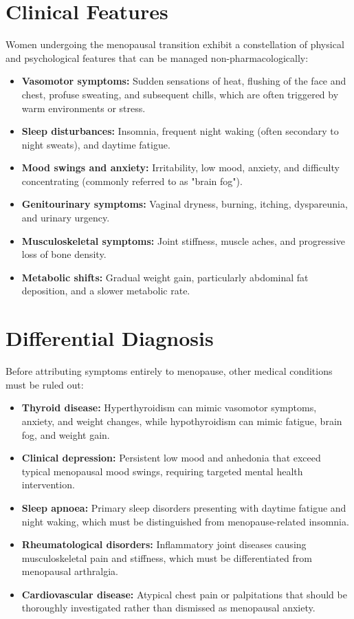 \section*{Clinical Features}
Women undergoing the menopausal transition exhibit a constellation of physical and psychological features that can be managed non-pharmacologically:
\begin{itemize}
    \item \textbf{Vasomotor symptoms:} Sudden sensations of heat, flushing of the face and chest, profuse sweating, and subsequent chills, which are often triggered by warm environments or stress.
    \item \textbf{Sleep disturbances:} Insomnia, frequent night waking (often secondary to night sweats), and daytime fatigue.
    \item \textbf{Mood swings and anxiety:} Irritability, low mood, anxiety, and difficulty concentrating (commonly referred to as "brain fog").
    \item \textbf{Genitourinary symptoms:} Vaginal dryness, burning, itching, dyspareunia, and urinary urgency.
    \item \textbf{Musculoskeletal symptoms:} Joint stiffness, muscle aches, and progressive loss of bone density.
    \item \textbf{Metabolic shifts:} Gradual weight gain, particularly abdominal fat deposition, and a slower metabolic rate.
\end{itemize}

\section*{Differential Diagnosis}
Before attributing symptoms entirely to menopause, other medical conditions must be ruled out:
\begin{itemize}
    \item \textbf{Thyroid disease:} Hyperthyroidism can mimic vasomotor symptoms, anxiety, and weight changes, while hypothyroidism can mimic fatigue, brain fog, and weight gain.
    \item \textbf{Clinical depression:} Persistent low mood and anhedonia that exceed typical menopausal mood swings, requiring targeted mental health intervention.
    \item \textbf{Sleep apnoea:} Primary sleep disorders presenting with daytime fatigue and night waking, which must be distinguished from menopause-related insomnia.
    \item \textbf{Rheumatological disorders:} Inflammatory joint diseases causing musculoskeletal pain and stiffness, which must be differentiated from menopausal arthralgia.
    \item \textbf{Cardiovascular disease:} Atypical chest pain or palpitations that should be thoroughly investigated rather than dismissed as menopausal anxiety.
\end{itemize}

